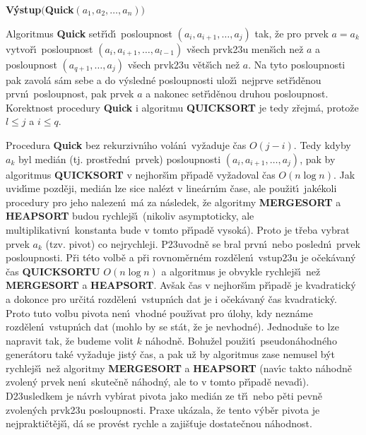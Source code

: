 {\bf V\'ystup$($Quick$(a_1,a_2,\dots,a_n))$
\bigskip

}\flushpar Algoritmus {\bf Quick} set\v r\'\i d\'\i\ posloupnost 
$(a_i,a_{i+1},\dots,a_j)$ tak, \v ze pro prvek $a=a_k$ vytvo\v r\'\i\ posloupnost 
$(a_i,a_{i+1},\dots,a_{l-1})$ v\v sech prvk\accent23u men\v s\'\i ch ne\v z $
a$ 
a posloupnost
$(a_{q+1},\dots,a_j)$ v\v sech prvk\accent23u 
v\v et\v s\'\i ch ne\v z $a$. Na tyto posloupnosti pak 
zavol\'a s\'am sebe a do v\'ysledn\'e posloupnosti ulo\v z\'\i\ 
nejprve set\v r\'\i d\v enou prvn\'\i\ posloupnost, pak prvek $a$ a nakonec 
set\v r\'\i d\v enou druhou posloupnost. Korektnost procedury 
{\bf Quick}  i algoritmu {\bf QUICKSORT} je tedy z\v rejm\'a, proto\v ze 
$l\le j$ a $i\le q$. 
\medskip

\flushpar Procedura {\bf Quick} bez rekurzivn\'\i ho vol\'an\'\i\ 
vy\v zaduje \v cas $O(j-i)$. Tedy kdyby $a_k$ byl medi\'an (tj. 
prost\v redn\'\i\ prvek) posloupnosti $(a_i,a_{i+1},\dots,a_j)$, pak 
by algoritmus {\bf QUICKSORT} v nejhor\v s\'\i m p\v r\'\i pad\v e vy\-\v zadoval \v cas $
O(n\log n)$. Jak 
uvid\'\i me pozd\v eji, medi\'an lze sice nal\'ezt v line\'ar\-n\'\i m \v case, ale 
pou\v zit\'\i\ jak\'ekoli procedury pro jeho nalezen\'\i\ m\'a za 
n\'asledek, \v ze algoritmy {\bf MERGESORT} a {\bf HEAPSORT }
budou rychlej\v s\'\i\ (nikoliv asymptoticky, ale 
multiplikativn\'\i\ konstanta bude v tomto p\v r\'\i pad\v e vysok\'a). Proto je t\v reba 
vybrat prvek $a_k$ (tzv. pivot) co 
nejrychleji. P\accent23uvodn\v e se bral prvn\'\i\ nebo 
posledn\'\i\ prvek posloupnosti. P\v ri t\'eto volb\v e a p\v ri 
rovnom\v ern\'em rozd\v elen\'\i\ vstup\accent23u je 
o\v cek\'avan\'y \v cas {\bf QUICKSORTU} $O(n\log n)$ a algoritmus je 
obvykle rychlej\v s\'\i\ ne\v z {\bf MERGESORT} a 
{\bf HEAPSORT}. Av\v sak \v cas v nejhor\v s\'\i m p\v r\'\i pad\v e je 
kvadratick\'y a dokonce pro ur\v cit\'a rozd\v elen\'\i\ vstupn\'\i ch dat 
je i o\v cek\'avan\'y \v cas kvadratick\'y. 
Proto tuto volbu pivota nen\'\i\ vhodn\'e pou\v z\'\i vat pro \'ulohy, kdy 
nezn\'ame rozd\v elen\'\i\ vstupn\'\i ch dat (mohlo by se st\'at, \v ze je 
nevhodn\'e). Jednodu\v se to lze napravit tak, \v ze budeme volit $
k$ n\'ahodn\v e. Bohu\v zel 
pou\v zit\'\i\ pseudon\'ahodn\'eho gener\'atoru tak\'e vy\v zaduje jist\'y \v cas, a pak 
u\v z by algoritmus zase nemusel b\'yt rychlej\v s\'\i\ ne\v z algoritmy 
{\bf MERGESORT} a {\bf HEAPSORT} (nav\'\i c takto n\'ahodn\v e zvolen\'y 
prvek nen\'\i\ skute\v cn\v e n\'ahodn\'y, ale to v tomto p\v r\'\i pad\v e 
nevad\'\i ). D\accent23usledkem je n\'avrh vyb\'\i rat pivota jako 
medi\'an ze t\v r\'\i\ nebo p\v eti pevn\v e zvolen\'ych prvk\accent23u 
posloupnosti. Praxe uk\'azala, \v ze tento v\'yb\v er pivota je 
nej\-prakti\v ct\v ej\v s\'\i , d\'a se prov\'est rychle a zaji\v s\v tuje 
dostate\v cnou n\'a\-hod\-nost.
\medskip

